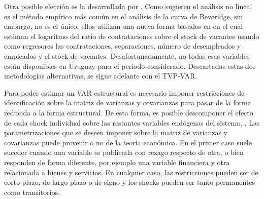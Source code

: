 Otra posible elección es la desarrollada por \cite{Barnichon2012, Hobijn2013}. Como sugieren \cite{Hobijn2013} el análisis no lineal es el método empírico más común en el análisis de la curva de Beveridge, sin embargo, no es el único, ellos utilizan una nueva forma basados en \cite{Barnichon2012} en el cual estiman el logaritmo del ratio de contrataciones sobre el stock de vacantes usando como regresores las contrataciones, separaciones, número de desempleados y empleados y el stock de vacantes. Desafortunadamente, no todas esas variables están disponibles en Uruguay para el periodo considerado. Descartadas estas dos metodologías alternativas, se sigue adelante con el TVP-VAR.



Para poder estimar un VAR estructural es necesario imponer restricciones de identificación sobre la matriz de varianzas y covarianzas para pasar de la forma reducida a la forma estructural. De esta forma, es posible descomponer el efecto de cada shock individual sobre las restantes variables endógenas del sistema, \cite{Hamilton1994}. Las parametrizaciones que se deseen imponer sobre la matriz de varianzas y covarianzas puede provenir o no de la teoría económica. En el primer caso suele suceder cuando una variable es publicada con rezago respecto de otra, o bien responden de forma diferente, por ejemplo una variable financiera y otra relacionada a bienes y servicios. En cualquier caso, las restricciones pueden ser de corto plazo, de largo plazo o de signo y los shocks pueden ser tanto permanentes como transitorios. 




